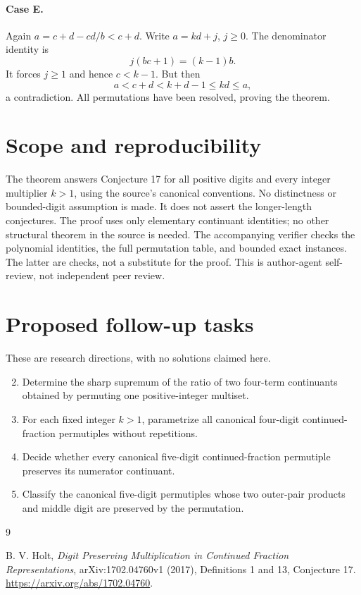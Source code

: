 \documentclass[11pt]{article}
\begin{document}
\paragraph{Case E.}
Again $a=c+d-cd/b<c+d$. Write $a=kd+j$, $j\ge0$.
The denominator identity is
\[
 j(bc+1)=(k-1)b.
\]
It forces $j\ge1$ and hence $c<k-1$. But then
\[
 a<c+d<k+d-1\le kd\le a,
\]
a contradiction. All permutations have been resolved, proving the theorem.

\section*{Scope and reproducibility}
The theorem answers Conjecture 17 for all positive digits and every
integer multiplier $k>1$, using the source's canonical conventions.
No distinctness or bounded-digit assumption is made. It does not assert
the longer-length conjectures. The proof uses only elementary
continuant identities; no other structural theorem in the source is needed.
The accompanying verifier checks the polynomial identities, the full
permutation table, and bounded exact instances. The latter are checks,
not a substitute for the proof. This is author-agent self-review,
not independent peer review.

\section*{Proposed follow-up tasks}
These are research directions, with no solutions claimed here.
\begin{enumerate}
\setcounter{enumi}{1}
\item Determine the sharp supremum of the ratio of two four-term
continuants obtained by permuting one positive-integer multiset.
\item For each fixed integer $k>1$, parametrize all canonical
four-digit continued-fraction permutiples without repetitions.
\item Decide whether every canonical five-digit continued-fraction
permutiple preserves its numerator continuant.
\item Classify the canonical five-digit permutiples whose two
outer-pair products and middle digit are preserved by the permutation.
\end{enumerate}
\begin{thebibliography}{9}
\raggedright
{} B. V. Holt, \emph{Digit Preserving Multiplication in
Continued Fraction Representations}, arXiv:1702.04760v1 (2017),
Definitions 1 and 13, Conjecture 17.
\url{https://arxiv.org/abs/1702.04760}.
\end{thebibliography}
\end{document}
